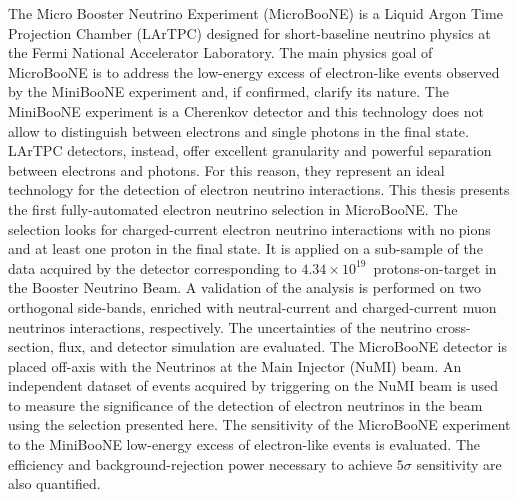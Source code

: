 The Micro Booster Neutrino Experiment (MicroBooNE) is a Liquid Argon Time Projection Chamber (LArTPC) designed for short-baseline neutrino physics at the Fermi National Accelerator Laboratory. The main physics goal of MicroBooNE is to address the low-energy excess of electron-like events observed by the MiniBooNE experiment and, if confirmed, clarify its nature.
The MiniBooNE experiment is a Cherenkov detector and this technology does not allow to distinguish between electrons and single photons in the final state. 
LArTPC detectors, instead, offer excellent granularity and powerful separation between electrons and photons. For this reason, they represent an ideal technology for the detection of electron neutrino interactions.
This thesis presents the first fully-automated electron neutrino selection in MicroBooNE. The selection looks for charged-current electron neutrino interactions with no pions and at least one proton in the final state. It is applied on a sub-sample of the data acquired by the detector corresponding to $4.34\times10^{19}$~protons-on-target in the Booster Neutrino Beam. A validation of the analysis is performed on two orthogonal side-bands, enriched with neutral-current and charged-current muon neutrinos interactions, respectively. The uncertainties of the neutrino cross-section, flux, and detector simulation are evaluated.
The MicroBooNE detector is placed off-axis with the Neutrinos at the Main Injector (NuMI) beam. An independent dataset of events acquired by triggering on the NuMI beam is used to measure the significance of the detection of electron neutrinos in the beam using the selection presented here. 
The sensitivity of the MicroBooNE experiment to the MiniBooNE low-energy excess of electron-like events is evaluated. The efficiency and background-rejection power necessary to achieve $5\sigma$ sensitivity are also quantified.